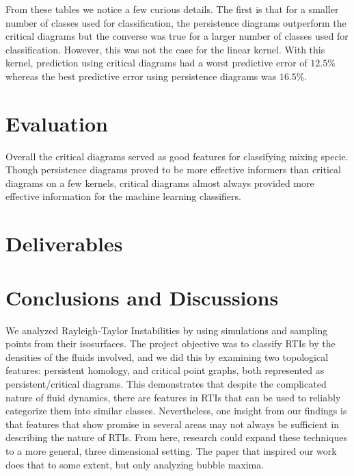\documentclass[12pt, fullpage,letterpaper]{article}
\theoremstyle{definition}
\begin{document}
	From these tables we notice a few curious details. The first is that for a smaller number of classes used for classification, the persistence diagrams outperform the critical diagrams but the converse was true for a larger number of classes used for classification. However, this was not the case for the linear kernel. With this kernel, prediction using critical diagrams had a worst predictive error of $12.5\%$ whereas the best predictive error using persistence diagrams was $16.5\%$. 

\section*{\normalfont Evaluation}
Overall the critical diagrams served as good features for classifying mixing specie. Though persistence diagrams proved to be more effective informers than critical diagrams on a few kernels, critical diagrams almost always provided more effective information for the machine learning classifiers.

\section*{\normalfont Deliverables} 
\section*{\normalfont Conclusions and Discussions}
	We analyzed Rayleigh-Taylor Instabilities by using simulations and sampling points from their isosurfaces. The project objective was to classify RTIs by the densities of the fluids involved, and we did this by examining two topological features: persistent homology, and critical point graphs, both represented as persistent/critical diagrams. This demonstrates that despite the complicated nature of fluid dynamics, there are features in RTIs that can be used to reliably categorize them into similar classes. Nevertheless, one insight from our findings is that features that show promise in several areas may not always be sufficient in describing the nature of RTIs. From here, research could expand these techniques to a more general, three dimensional setting. The paper that inspired our work does that to some extent, but only analyzing bubble maxima.
{}

\end{document}
